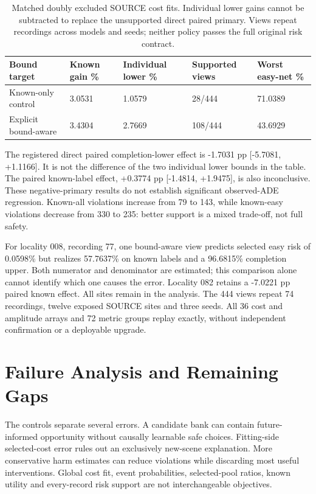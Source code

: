 \documentclass[10pt,twocolumn,letterpaper]{article}
\begin{document}
\begin{table}[!t]\centering\small
\begin{tabularx}{\textwidth}{@{}XXXXX@{}}\toprule
Bound target & Known gain \% & Individual lower \% & Supported views & Worst easy-net \% \\
\midrule
Known-only control & 3.0531 & 1.0579 & 28/444 & 71.0389 \\
Explicit bound-aware & 3.4304 & 2.7669 & 108/444 & 43.6929 \\
\bottomrule\end{tabularx}
\caption{Matched doubly excluded SOURCE cost fits. Individual lower gains cannot be subtracted to replace the unsupported direct paired primary. Views repeat recordings across models and seeds; neither policy passes the full original risk contract.}\end{table}
The registered direct paired completion-lower effect is -1.7031 pp
[-5.7081, +1.1166]. It is not the difference of the two individual lower bounds
in the table. The paired known-label effect, +0.3774 pp [-1.4814, +1.9475], is
also inconclusive. These negative-primary results do not establish significant
observed-ADE regression. Known-all violations increase from 79 to 143, while
known-easy violations decrease from 330 to 235: better support is a mixed
trade-off, not full safety.

For locality 008, recording 77, one bound-aware view predicts selected easy
risk of 0.0598\% but realizes 57.7637\% on known labels and a 96.6815\% completion
upper. Both numerator and denominator are estimated; this comparison alone
cannot identify which one causes the error. Locality 082 retains a -7.0221 pp
paired known effect. All sites remain in the analysis. The 444 views repeat
74 recordings, twelve exposed SOURCE sites and three seeds. All 36 cost and
amplitude arrays and 72 metric groups replay exactly, without independent
confirmation or a deployable upgrade.

\section{Failure Analysis and Remaining Gaps}
The controls separate several errors. A candidate bank can contain future-
informed opportunity without causally learnable safe choices. Fitting-side
selected-cost error rules out an exclusively new-scene explanation. More
conservative harm estimates can reduce violations while discarding most useful
interventions. Global cost fit, event probabilities, selected-pool ratios,
known utility and every-record risk support are not interchangeable objectives.
\end{document}
